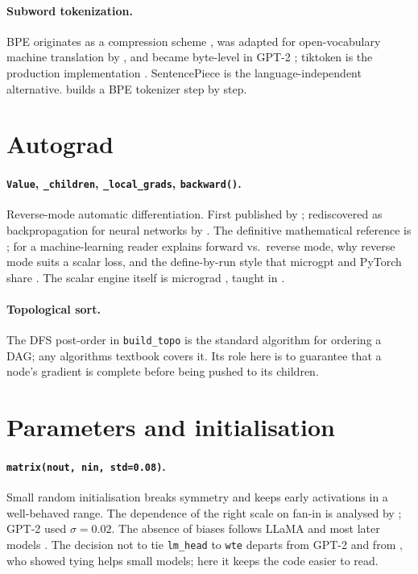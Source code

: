\documentclass[10pt,letterpaper]{article}
\newcommand{\code}[1]{\lstinline[basicstyle=\ttfamily\small]|#1|}
\begin{document}
\paragraph{Subword tokenization.} BPE originates as a compression scheme \parencite{gage1994bpe}, was adapted for open-vocabulary machine translation by \textcite{sennrich2016bpe}, and became byte-level in GPT-2 \parencite{radford2019gpt2}; tiktoken is the production implementation \parencite{openai2022tiktoken}. SentencePiece \parencite{kudo2018sentencepiece} is the language-independent alternative. \textcite{karpathy2024tokenizervideo} builds a BPE tokenizer step by step.

\section{Autograd}

\paragraph{\code{Value}, \code{_children}, \code{_local_grads}, \code{backward()}.} Reverse-mode automatic differentiation. First published by \textcite{linnainmaa1976taylor}; rediscovered as backpropagation for neural networks by \textcite{rumelhart1986learning}. The definitive mathematical reference is \textcite{griewank2008evaluating}; for a machine-learning reader \textcite{baydin2018autodiff} explains forward vs.\ reverse mode, why reverse mode suits a scalar loss, and the define-by-run style that microgpt and PyTorch share \parencite{paszke2017autodiff,paszke2019pytorch}. The scalar engine itself is micrograd \parencite{karpathy2020micrograd}, taught in \textcite{karpathy2022microgradvideo}.

\paragraph{Topological sort.} The DFS post-order in \code{build_topo} is the standard algorithm for ordering a DAG; any algorithms textbook covers it. Its role here is to guarantee that a node's gradient is complete before being pushed to its children.

\section{Parameters and initialisation}

\paragraph{\code{matrix(nout, nin, std=0.08)}.} Small random initialisation breaks symmetry and keeps early activations in a well-behaved range. The dependence of the right scale on fan-in is analysed by \textcite{glorot2010init}; GPT-2 used $\sigma=0.02$. The absence of biases follows LLaMA and most later models \parencite{touvron2023llama}. The decision not to tie \code{lm_head} to \code{wte} departs from GPT-2 and from \textcite{press2017weighttying}, who showed tying helps small models; here it keeps the code easier to read.
\end{document}
